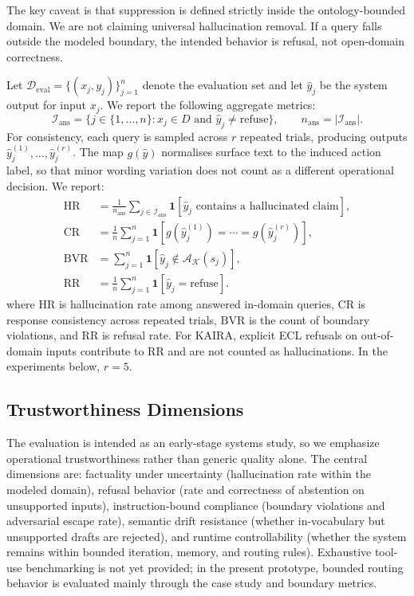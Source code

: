 \documentclass[11pt,a4paper]{article}
\begin{document}
The key caveat is that suppression is defined strictly inside the ontology-bounded domain. We are not claiming universal hallucination removal. If a query falls outside the modeled boundary, the intended behavior is refusal, not open-domain correctness.

Let $\mathcal{D}_{\mathrm{eval}}=\{(x_j,y_j)\}_{j=1}^{n}$ denote the evaluation set and let $\widehat{y}_j$ be the system output for input $x_j$. We report the following aggregate metrics:
\[
\mathcal{I}_{\mathrm{ans}}=\{j \in \{1,\dots,n\}: x_j \in D \text{ and } \widehat{y}_j \neq \mathrm{refuse}\}, \qquad n_{\mathrm{ans}}=|\mathcal{I}_{\mathrm{ans}}|.
\]
For consistency, each query is sampled across $r$ repeated trials, producing outputs $\widehat{y}_j^{(1)},\dots,\widehat{y}_j^{(r)}$. The map $g(\widehat{y})$ normalises surface text to the induced action label, so that minor wording variation does not count as a different operational decision. We report:
\begin{align}
\mathrm{HR} &= \frac{1}{n_{\mathrm{ans}}}\sum_{j \in \mathcal{I}_{\mathrm{ans}}}\mathbf{1}[\widehat{y}_j \text{ contains a hallucinated claim}], \label{eq:metric_hr}\\
\mathrm{CR} &= \frac{1}{n}\sum_{j=1}^{n}\mathbf{1}[g(\widehat{y}_j^{(1)})=\cdots=g(\widehat{y}_j^{(r)})], \label{eq:metric_cr}\\
\mathrm{BVR} &= \sum_{j=1}^{n}\mathbf{1}[\widehat{y}_j \notin \mathcal{A}_{\mathcal{K}}(s_j)], \label{eq:metric_bvr}\\
\mathrm{RR} &= \frac{1}{n}\sum_{j=1}^{n}\mathbf{1}[\widehat{y}_j=\mathrm{refuse}]. \label{eq:metric_rr}
\end{align}
where $\mathrm{HR}$ is hallucination rate among answered in-domain queries, $\mathrm{CR}$ is response consistency across repeated trials, $\mathrm{BVR}$ is the count of boundary violations, and $\mathrm{RR}$ is refusal rate. For KAIRA, explicit ECL refusals on out-of-domain inputs contribute to $\mathrm{RR}$ and are not counted as hallucinations.
In the experiments below, $r=5$.

\subsection{Trustworthiness Dimensions}
The evaluation is intended as an early-stage systems study, so we emphasize operational trustworthiness rather than generic quality alone. The central dimensions are: factuality under uncertainty (hallucination rate within the modeled domain), refusal behavior (rate and correctness of abstention on unsupported inputs), instruction-bound compliance (boundary violations and adversarial escape rate), semantic drift resistance (whether in-vocabulary but unsupported drafts are rejected), and runtime controllability (whether the system remains within bounded iteration, memory, and routing rules). Exhaustive tool-use benchmarking is not yet provided; in the present prototype, bounded routing behavior is evaluated mainly through the case study and boundary metrics.
\end{document}
